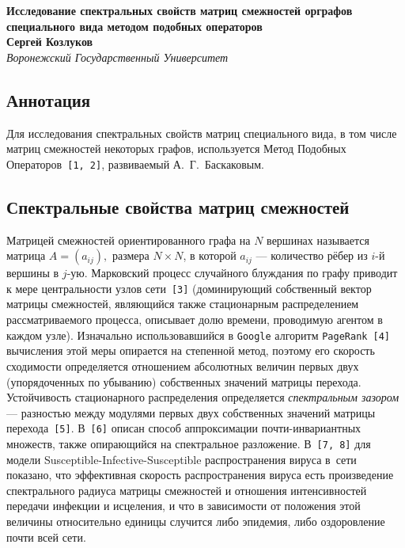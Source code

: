 \documentclass[12pt]{article}
\theoremstyle{definition}
\begin{document}

\begin{center}
    \textbf{Исследование спектральных свойств матриц
смежностей орграфов специального вида
методом подобных операторов}\\[3mm]
    \textbf{Сергей Козлуков}\\[2mm]
    \emph{Воронежский Государственный Университет}\\[2mm]
\end{center}

\subsection*{Аннотация}
Для исследования спектральных свойств матриц специального вида,
в том числе матриц смежностей некоторых графов,
используется Метод Подобных Операторов~\texttt{[1, 2]},
развиваемый А.~Г.~Баскаковым.

\subsection*{Спектральные свойства матриц смежностей}
Матрицей смежностей ориентированного графа на \( N \) вершинах
    называется матрица \( A=(a_{ij}), \)
    размера \( N\times N \),
    в которой \( a_{ij} \) --- количество рёбер
    из \( i \)-й вершины в \( j \)-ую.
Марковский процесс случайного блуждания по графу
    приводит к мере центральности
    узлов сети~\texttt{[3]}
    (доминирующий собственный вектор матрицы смежностей,
     являющийся также стационарным распределением
     рассматриваемого процесса,
     описывает долю времени, проводимую агентом в каждом узле).
Изначально использовавшийся в \texttt{Google}
    алгоритм \texttt{PageRank}~\texttt{[4]}
    вычисления этой меры опирается на степенной метод,
    поэтому его скорость сходимости
    определяется отношением абсолютных величин
    первых двух (упорядоченных по убыванию)
    собственных значений матрицы перехода.
Устойчивость стационарного распределения
    определяется \emph{спектральным зазором}
    --- разностью между модулями первых двух
    собственных значений матрицы перехода~\texttt{[5]}.
В~\texttt{[6]} описан способ
    аппроксимации почти-инвариантных множеств,
    также опирающийся на спектральное разложение.
В~\texttt{[7, 8]}
    для модели Susceptible-Infective-Susceptible
    распространения вируса в~сети
    показано, что эффективная скорость
    распространения вируса есть произведение
    спектрального радиуса матрицы смежностей
    и отношения интенсивностей передачи инфекции и исцеления,
    и что в зависимости от положения этой величины относительно единицы
    случится либо эпидемия, либо оздоровление почти всей сети.
\end{document}
